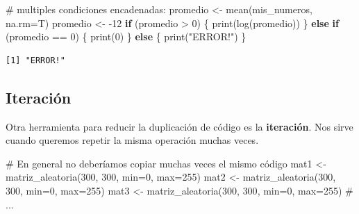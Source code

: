 \documentclass[
  letterpaper,
  DIV=11,
  numbers=noendperiod]{scrartcl}
\newenvironment{Shaded}{\begin{snugshade}}{\end{snugshade}}
\newcommand{\AttributeTok}[1]{\textcolor[rgb]{0.40,0.45,0.13}{#1}}
\newcommand{\CommentTok}[1]{\textcolor[rgb]{0.37,0.37,0.37}{#1}}
\newcommand{\ControlFlowTok}[1]{\textcolor[rgb]{0.00,0.23,0.31}{\textbf{#1}}}
\newcommand{\DecValTok}[1]{\textcolor[rgb]{0.68,0.00,0.00}{#1}}
\newcommand{\FunctionTok}[1]{\textcolor[rgb]{0.28,0.35,0.67}{#1}}
\newcommand{\NormalTok}[1]{\textcolor[rgb]{0.00,0.23,0.31}{#1}}
\newcommand{\OtherTok}[1]{\textcolor[rgb]{0.00,0.23,0.31}{#1}}
\newcommand{\SpecialCharTok}[1]{\textcolor[rgb]{0.37,0.37,0.37}{#1}}
\newcommand{\StringTok}[1]{\textcolor[rgb]{0.13,0.47,0.30}{#1}}
\begin{document}
\begin{Shaded}
\begin{Highlighting}[]
\CommentTok{\# multiples condiciones encadenadas: }
\NormalTok{promedio }\OtherTok{\textless{}{-}} \FunctionTok{mean}\NormalTok{(mis\_numeros, }\AttributeTok{na.rm=}\NormalTok{T) }
\NormalTok{promedio }\OtherTok{\textless{}{-}} \SpecialCharTok{{-}}\DecValTok{12}
\ControlFlowTok{if}\NormalTok{ (promedio }\SpecialCharTok{\textgreater{}} \DecValTok{0}\NormalTok{) \{}
  \FunctionTok{print}\NormalTok{(}\FunctionTok{log}\NormalTok{(promedio)) }
\NormalTok{\} }\ControlFlowTok{else} \ControlFlowTok{if}\NormalTok{ (promedio }\SpecialCharTok{==} \DecValTok{0}\NormalTok{) \{}
    \FunctionTok{print}\NormalTok{(}\DecValTok{0}\NormalTok{) }
\NormalTok{\} }\ControlFlowTok{else}\NormalTok{ \{   }
    \FunctionTok{print}\NormalTok{(}\StringTok{"ERROR!"}\NormalTok{) }
\NormalTok{\}}
\end{Highlighting}
\end{Shaded}

\begin{verbatim}
[1] "ERROR!"
\end{verbatim}

\subsection{Iteración}\label{iteraciuxf3n}

Otra herramienta para reducir la duplicación de código es la
\textbf{iteración}. Nos sirve cuando queremos repetir la misma operación
muchas veces.

\begin{Shaded}
\begin{Highlighting}[]
\CommentTok{\# En general no deberíamos copiar muchas veces el mismo código}
\NormalTok{mat1 }\OtherTok{\textless{}{-}} \FunctionTok{matriz\_aleatoria}\NormalTok{(}\DecValTok{300}\NormalTok{, }\DecValTok{300}\NormalTok{, }\AttributeTok{min=}\DecValTok{0}\NormalTok{, }\AttributeTok{max=}\DecValTok{255}\NormalTok{)}
\NormalTok{mat2 }\OtherTok{\textless{}{-}} \FunctionTok{matriz\_aleatoria}\NormalTok{(}\DecValTok{300}\NormalTok{, }\DecValTok{300}\NormalTok{, }\AttributeTok{min=}\DecValTok{0}\NormalTok{, }\AttributeTok{max=}\DecValTok{255}\NormalTok{)}
\NormalTok{mat3 }\OtherTok{\textless{}{-}} \FunctionTok{matriz\_aleatoria}\NormalTok{(}\DecValTok{300}\NormalTok{, }\DecValTok{300}\NormalTok{, }\AttributeTok{min=}\DecValTok{0}\NormalTok{, }\AttributeTok{max=}\DecValTok{255}\NormalTok{) }
\CommentTok{\# ...  }
\end{Highlighting}
\end{Shaded}
\end{document}
